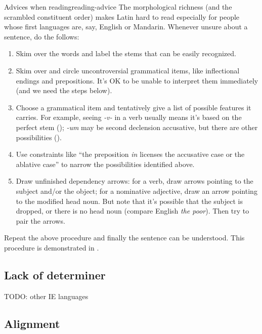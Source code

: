 \documentclass[a4paper, oneside]{report}
\newcommand{\form}[1]{\emph{#1}}
\begin{document}
\begin{learnbox}{Advices when reading}{reading-advice}
    The morphological richness (and the scrambled constituent order)
    makes Latin hard to read 
    especially for people whose first languages are, say, 
    English or Mandarin. 
    Whenever unsure about a sentence, do the follows: 
    \begin{enumerate}
        \item Skim over the words and label the stems that can be easily recognized.  
        \item Skim over and circle uncontroversial grammatical items,  
            like inflectional endings and prepositions. 
            It's OK to be unable to interpret them immediately (and we need the steps below).
        \item Choose a grammatical item and tentatively give a list of possible features it carries.  
            For example, seeing \form{-v-} in a verb usually means
            it's based on the perfect stem
            ();
            \form{-um} may be second declension accusative,
            but there are other possibilities
            (). 
        \item Use constraints like 
            ``the preposition \form{in} licenses the accusative case or the ablative case'' 
            to narrow the possibilities identified above.
        \item Draw unfinished dependency arrows:
            for a verb, draw arrows pointing to the subject and/or the object; 
            for a nominative adjective, draw an arrow pointing to the modified head noun. 
            But note that it's possible that the subject is dropped, 
            or there is no head noun (compare English \form{the poor}).
            Then try to pair the arrows.
    \end{enumerate}
    Repeat the above procedure and finally the sentence can be understood. 
    This procedure is demonstrated in .
\end{learnbox}

\subsection{Lack of determiner}

TODO: other IE languages

\subsection{Alignment}
\end{document}
